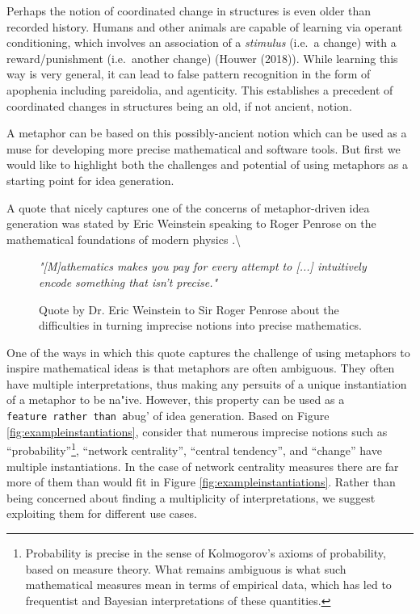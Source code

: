 \documentclass[
  letterpaper,
  DIV=11,
  numbers=noendperiod]{scrreprt}
\begin{document}
Perhaps the notion of coordinated change in structures is even older
than recorded history. Humans and other animals are capable of learning
via operant conditioning, which involves an association of a
\textit{stimulus} (i.e.~a change) with a reward/punishment (i.e.~another
change) (Houwer (2018)). While learning this way is very general, it can
lead to false pattern recognition in the form of apophenia including
pareidolia, and agenticity. This establishes a precedent of coordinated
changes in structures being an old, if not ancient, notion.

A metaphor can be based on this possibly-ancient notion which can be
used as a muse for developing more precise mathematical and software
tools. But first we would like to highlight both the challenges and
potential of using metaphors as a starting point for idea generation.

A quote that nicely captures one of the concerns of metaphor-driven idea
generation was stated by Eric Weinstein speaking to Roger Penrose on the
mathematical foundations of modern physics
\cite{Weinstein2020}.\textbackslash{}

\begin{figure}

\begin{tcolorbox}[title={Quotation}]
\textit{"[M]athematics makes you pay for every attempt to [...] intuitively encode something that isn't precise."}

\end{tcolorbox}

\caption{Quote by Dr. Eric Weinstein to Sir Roger Penrose about the difficulties in turning imprecise notions into precise mathematics.}

\end{figure}

One of the ways in which this quote captures the challenge of using
metaphors to inspire mathematical ideas is that metaphors are often
ambiguous. They often have multiple interpretations, thus making any
persuits of a unique instantiation of a metaphor to be na"ive. However,
this property can be used as a
\texttt{feature\textquotesingle{}\ rather\ than\ a}bug' of idea
generation. Based on Figure \ref{fig:exampleinstantiations}, consider
that numerous imprecise notions such as
``probability''\footnote{Probability is precise in the sense of Kolmogorov's axioms of probability, based on measure theory. What remains ambiguous is what such mathematical measures mean in terms of empirical data, which has led to frequentist and Bayesian interpretations of these quantities.},
``network centrality'', ``central tendency'', and ``change'' have
multiple instantiations. In the case of network centrality measures
there are far more of them than would fit in Figure
\ref{fig:exampleinstantiations}. Rather than being concerned about
finding a multiplicity of interpretations, we suggest exploiting them
for different use cases.
\end{document}
